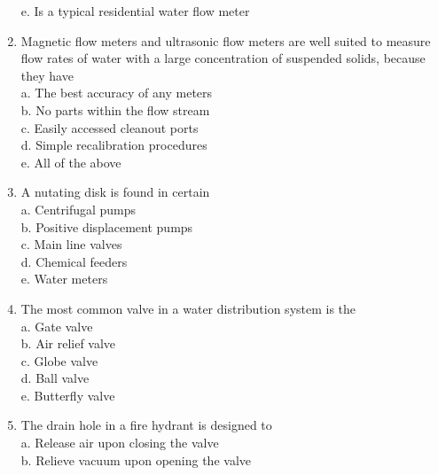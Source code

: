 \documentclass{article}
\begin{document}
\begin{enumerate}[1.]
e. Is a typical residential water flow meter\\

\item Magnetic flow meters and ultrasonic flow meters are well suited to measure flow rates of water with a large concentration of suspended solids, because they have\\


a. The best accuracy of any meters\\

b. No parts within the flow stream\\

c. Easily accessed cleanout ports\\

d. Simple recalibration procedures\\

e. All of the above\\

\item A nutating disk is found in certain\\
a. Centrifugal pumps\\

b. Positive displacement pumps\\

c. Main line valves\\

d. Chemical feeders\\

e. Water meters\\

\item The most common valve in a water distribution system is the\\
a. Gate valve\\

b. Air relief valve\\

c. Globe valve\\

d. Ball valve\\

e. Butterfly valve\\

\item The drain hole in a fire hydrant is designed to\\
a. Release air upon closing the valve\\

b. Relieve vacuum upon opening the valve\\


\end{enumerate}
\end{document}
